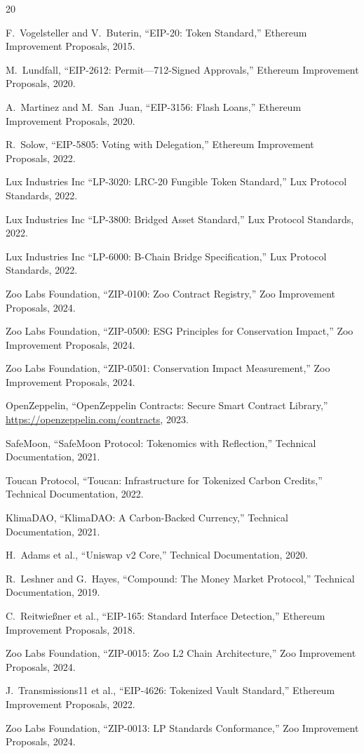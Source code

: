 \documentclass[11pt,letterpaper]{article}
\begin{document}

\begin{thebibliography}{20}

F.~Vogelsteller and V.~Buterin, ``EIP-20: Token Standard,'' Ethereum Improvement Proposals, 2015.

M.~Lundfall, ``EIP-2612: Permit---712-Signed Approvals,'' Ethereum Improvement Proposals, 2020.

A.~Martinez and M.~San~Juan, ``EIP-3156: Flash Loans,'' Ethereum Improvement Proposals, 2020.

R.~Solow, ``EIP-5805: Voting with Delegation,'' Ethereum Improvement Proposals, 2022.

Lux Industries Inc ``LP-3020: LRC-20 Fungible Token Standard,'' Lux Protocol Standards, 2022.

Lux Industries Inc ``LP-3800: Bridged Asset Standard,'' Lux Protocol Standards, 2022.

Lux Industries Inc ``LP-6000: B-Chain Bridge Specification,'' Lux Protocol Standards, 2022.

Zoo Labs Foundation, ``ZIP-0100: Zoo Contract Registry,'' Zoo Improvement Proposals, 2024.

Zoo Labs Foundation, ``ZIP-0500: ESG Principles for Conservation Impact,'' Zoo Improvement Proposals, 2024.

Zoo Labs Foundation, ``ZIP-0501: Conservation Impact Measurement,'' Zoo Improvement Proposals, 2024.

OpenZeppelin, ``OpenZeppelin Contracts: Secure Smart Contract Library,'' \url{https://openzeppelin.com/contracts}, 2023.

SafeMoon, ``SafeMoon Protocol: Tokenomics with Reflection,'' Technical Documentation, 2021.

Toucan Protocol, ``Toucan: Infrastructure for Tokenized Carbon Credits,'' Technical Documentation, 2022.

KlimaDAO, ``KlimaDAO: A Carbon-Backed Currency,'' Technical Documentation, 2021.

H.~Adams et al., ``Uniswap v2 Core,'' Technical Documentation, 2020.

R.~Leshner and G.~Hayes, ``Compound: The Money Market Protocol,'' Technical Documentation, 2019.

C.~Reitwie{\ss}ner et al., ``EIP-165: Standard Interface Detection,'' Ethereum Improvement Proposals, 2018.

Zoo Labs Foundation, ``ZIP-0015: Zoo L2 Chain Architecture,'' Zoo Improvement Proposals, 2024.

J.~Transmissions11 et al., ``EIP-4626: Tokenized Vault Standard,'' Ethereum Improvement Proposals, 2022.

Zoo Labs Foundation, ``ZIP-0013: LP Standards Conformance,'' Zoo Improvement Proposals, 2024.

\end{thebibliography}
\end{document}
